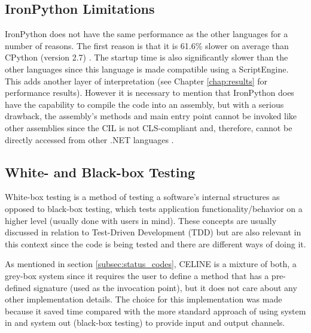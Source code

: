 \subsection{IronPython Limitations} \label{subsec:ironpython_limitations}
IronPython does not have the same performance as the other languages for a number of reasons. The first reason is that it is 61.6\% slower on average than CPython (version 2.7) \cite{IronPythonPerformance}. The startup time is also significantly slower than the other languages since this language is made compatible using a ScriptEngine. This adds another layer of interpretation (see Chapter \ref{chap:results} for performance results). However it is necessary to mention that IronPython does have the capability to compile the code into an assembly, but with a serious drawback, the assembly's methods and main entry point cannot be invoked like other assemblies since the CIL is not CLS-compliant \cite{CLSCompliant} and, therefore, cannot be directly accessed from other .NET languages \cite{AccessingPythonCode}.


\subsection{White- and Black-box Testing} \label{subsec:whitebox_blackbox}
White-box testing is a method of testing a software's internal structures as opposed to black-box testing, which tests application functionality/behavior on a higher level (usually done with users in mind). These concepts are usually discussed in relation to Test-Driven Development (TDD) but are also relevant in this context since the code is being tested and there are different ways of doing it.

As mentioned in section \ref{subsec:status_codes}, CELINE is a mixture of both, a grey-box system since it requires the user to define a method that has a pre-defined signature (used as the invocation point), but it does not care about any other implementation details. The choice for this implementation was made because it saved time compared with the more standard approach of using system in and system out (black-box testing) to provide input and output channels.

